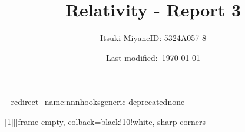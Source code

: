 \usepackage[T1]{fontenc}
\usepackage{tgtermes}

\setcounter{tocdepth}{3}

\usepackage{a4wide}

\usepackage{amssymb,amsfonts,amsthm,mathtools}
\usepackage{physics,braket,bm,slashed}

\usepackage[normalem]{ulem}

\usepackage{cancel}

\usepackage{fancybox,ascmac}

\theoremstyle{definition}
\newtheorem{dfn}{Definition}
\newtheorem{prop}{Proposition}
\newtheorem{thm}{Theorem}

\renewcommand{\proofname}{\textbf{Proof}}
\renewcommand{\qedsymbol}{$\blacksquare$}

\usepackage{silence}
\ExplSyntaxOn
\msg_redirect_name:nnn{hooks}{generic-deprecated}{none}
\ExplSyntaxOff


\usepackage{url,hyperref}
\usepackage[dvipsnames,svgnames]{xcolor}
\hypersetup{colorlinks=true,citecolor=FireBrick,linkcolor=Navy,urlcolor=purple}

\usepackage{tikz,pgf,pgfplots,circuitikz}
\pgfplotsset{compat=1.15}
\usetikzlibrary{intersections, arrows.meta, angles, calc, 3d, decorations.pathmorphing}
\usepackage[compat=1.1.0]{tikz-feynhand}

\usepackage{tcolorbox}
[1][]{frame empty, colback=black!10!white, sharp corners}

\makeatletter
   \renewcommand{\theequation}{$\thesection.\arabic{equation}$}
   
   \renewcommand{\thefigure}{\thesection.\arabic{figure}}
   
   \renewcommand{\thetable}{\thesection.\arabic{table}}
\makeatother

\renewcommand{\labelenumi}{$(\arabic{enumi})$}


\renewcommand{\thefootnote}{$\ast$\arabic{footnote}}

\title{Relativity - Report 3}
\author{Itsuki Miyane\quad ID: 5324A057-8}
\date{Last modified:\ \today}
